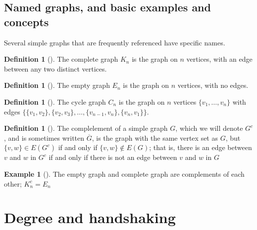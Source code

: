 \documentclass[10pt,]{book}
\theoremstyle{plain}
\theoremstyle{definition}
\newtheorem{definition}[theorem]{Definition}
\theoremstyle{definition}
\newtheorem{example}[theorem]{Example}
\theoremstyle{definition}
\begin{document}
\subsection[{Named graphs, and basic examples and concepts}]{Named graphs, and basic examples and concepts}\label{subsection-3}
\hypertarget{p-13}{}%
Several simple graphs that are frequently referenced have specific names.%
\begin{definition}[{}]\label{definition-2}
\hypertarget{p-14}{}%
The complete graph \(K_n\) is the graph on \(n\) vertices, with an edge between any two distinct vertices.%
\end{definition}
\begin{definition}[{}]\label{definition-3}
\hypertarget{p-15}{}%
The empty graph \(E_n\) is the graph on \(n\) vertices, with no edges.%
\end{definition}
\begin{definition}[{}]\label{definition-4}
\hypertarget{p-16}{}%
The cycle graph \(C_n\) is the graph on \(n\) vertices \(\{v_1,\dots, v_n\}\) with edges \(\{ \{v_1, v_2\}, \{v_2,v_3\},\dots,\{v_{n-1},v_n\}, \{v_n, v_1\}\}\).%
\end{definition}
\begin{definition}[{}]\label{definition-5}
\hypertarget{p-17}{}%
The complelement of a simple graph \(G\), which we will denote \(G^c\), and is sometimes written \(\overline{G}\), is the graph with the same vertex set as \(G\), but \(\{v,w\}\in E(G^c)\) if and only if \(\{v,w\}\notin E(G)\); that is, there is an edge between \(v\) and \(w\) in \(G^c\) if and only if there is not an edge between \(v\) and \(w\) in \(G\)%
\end{definition}
\begin{example}[]\label{example-2}
\hypertarget{p-18}{}%
The empty graph and complete graph are complements of each other; \(K_n^c=E_n\)%
\end{example}
\typeout{************************************************}
\typeout{************************************************}
\section[{Degree and handshaking}]{Degree and handshaking}\label{s_intro_degrees}
\typeout{************************************************}
\typeout{************************************************}
\end{document}
